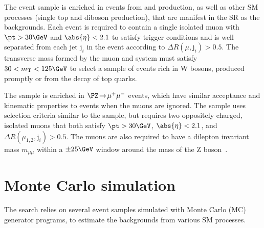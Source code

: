 The \mj event sample is enriched in events from \wmj and \ttbar
production, as well as other SM processes (\eg single top and diboson
production), that are manifest in the SR as the \lost
backgrounds. Each event is required to contain a single isolated muon
with $\pt > 30\GeV$ and $\abs{\eta} < 2.1$ to satisfy trigger
conditions and is well separated from each jet $\text{j}_i$ in the
event according to ${\Delta}R(\mu,\text{j}_i) > 0.5$. The transverse
mass formed by the muon \pt and \ptvecmiss system must satisfy $30 <
m_\text{T} < 125\GeV$ to select a sample of events rich in W bosons,
produced promptly or from the decay of top quarks.

The \mmj sample is enriched in $\PZ\! \rightarrow\!  \mu^+\mu^-$
events, which have similar acceptance and kinematic properties to
\znunuj events when the muons are ignored. The sample uses selection
criteria similar to the \mj sample, but requires two oppositely
charged, isolated muons that both satisfy $\pt > 30\GeV$, $\abs{\eta}
< 2.1$, and ${\Delta}R(\mu_{1,2},\text{j}_i) > 0.5$. The muons are
also required to have a dilepton invariant mass $m_{\mu\mu}$ within a
${\pm}25\GeV$ window around the mass of the Z
boson~\cite{1674-1137-38-9-090001}.


\section{Monte Carlo simulation}
\label{sec:simulation}

The search relies on several event samples simulated with Monte Carlo
(MC) generator programs, to estimate the backgrounds from various SM
processes.

